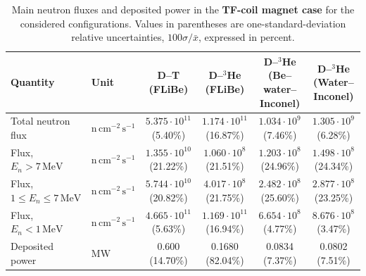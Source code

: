 
\begin{table}[!h]
\centering
\caption{Main neutron fluxes and deposited power in the \textbf{TF-coil magnet case} for the considered configurations. Values in parentheses are one-standard-deviation relative uncertainties,
$100\sigma/\bar{x}$, expressed in percent.}
\label{tab:magnetcase}

\begin{tabular}{@{}llcccc@{}}
\toprule
Quantity
& Unit
& \makecell{D--T\\(FLiBe)}
& \makecell{D--$^3$He\\(FLiBe)}
& \makecell{D--$^3$He\\(Be--water--\\Inconel)}
& \makecell{D--$^3$He\\(Water--\\Inconel)}
\\
\midrule

Total neutron flux
& $\mathrm{n\,cm^{-2}\,s^{-1}}$
& $5.375\cdot 10^{11}$ (5.40\%)
& $1.174\cdot 10^{11}$ (16.87\%)
& $1.034\cdot 10^{9}$ (7.46\%)
& $1.305\cdot 10^{9}$ (6.28\%)
\\

Flux, $E_n>7\,\mathrm{MeV}$
& $\mathrm{n\,cm^{-2}\,s^{-1}}$
& $1.355\cdot 10^{10}$ (21.22\%)
& $1.060\cdot 10^{8}$ (21.51\%)
& $1.203\cdot 10^{8}$ (24.96\%)
& $1.498\cdot 10^{8}$ (24.34\%)
\\

Flux, $1\leq E_n\leq7\,\mathrm{MeV}$
& $\mathrm{n\,cm^{-2}\,s^{-1}}$
& $5.744\cdot 10^{10}$ (20.82\%)
& $4.017\cdot 10^{8}$ (21.75\%)
& $2.482\cdot 10^{8}$ (25.60\%)
& $2.877\cdot 10^{8}$ (23.25\%)
\\

Flux, $E_n<1\,\mathrm{MeV}$
& $\mathrm{n\,cm^{-2}\,s^{-1}}$
& $4.665\cdot 10^{11}$ (5.63\%)
& $1.169\cdot 10^{11}$ (16.94\%)
& $6.654\cdot 10^{8}$ (4.77\%)
& $8.676\cdot 10^{8}$ (3.47\%)
\\

\midrule
Deposited power
& $\mathrm{MW}$
& 0.600 (14.70\%)
& 0.1680 (82.04\%)
& 0.0834 (7.37\%)
& 0.0802 (7.51\%)
\\

\bottomrule
\end{tabular}
\end{table}


